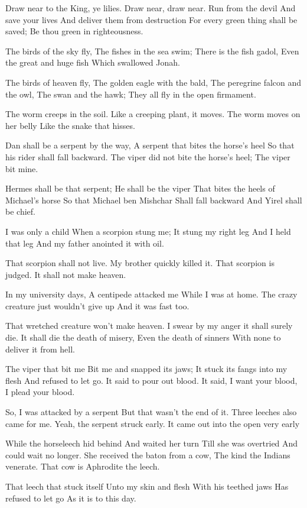\documentclass[
]{book}
\begin{document}
Draw near to the King, ye lilies.
Draw near, draw near.
Run from the devil
And save your lives
And deliver them from destruction
For every green thing shall be saved;
Be thou green in righteousness.

The birds of the sky fly,
The fishes in the sea swim;
There is the fish gadol,
Even the great and huge fish
Which swallowed Jonah.

The birds of heaven fly,
The golden eagle with the bald,
The peregrine falcon and the owl,
The swan and the hawk;
They all fly in the open firmament.

The worm creeps in the soil.
Like a creeping plant, it moves.
The worm moves on her belly
Like the snake that hisses.

Dan shall be a serpent by the way,
A serpent that bites the horse's heel
So that his rider shall fall backward.
The viper did not bite the horse's heel;
The viper bit mine.

Hermes shall be that serpent;
He shall be the viper
That bites the heels of Michael's horse
So that Michael ben Mishchar
Shall fall backward
And Yirel shall be chief.

I was only a child
When a scorpion stung me;
It stung my right leg
And I held that leg
And my father anointed it with oil.

That scorpion shall not live.
My brother quickly killed it.
That scorpion is judged.
It shall not make heaven.

In my university days,
A centipede attacked me
While I was at home.
The crazy creature just wouldn't give up
And it was fast too.

That wretched creature won't make heaven.
I swear by my anger it shall surely die.
It shall die the death of misery,
Even the death of sinners
With none to deliver it from hell.

The viper that bit me
Bit me and snapped its jaws;
It stuck its fangs into my flesh
And refused to let go.
It said to pour out blood.
It said, I want your blood,
I plead your blood.

So, I was attacked by a serpent
But that wasn't the end of it.
Three leeches also came for me.
Yeah, the serpent struck early.
It came out into the open very early

While the horseleech hid behind
And waited her turn
Till she was overtried
And could wait no longer.
She received the baton from a cow,
The kind the Indians venerate.
That cow is Aphrodite the leech.

That leech that stuck itself
Unto my skin and flesh
With his teethed jaws
Has refused to let go
As it is to this day.
\end{document}
